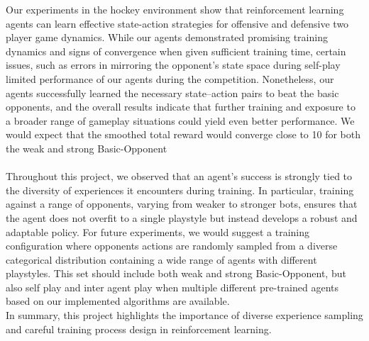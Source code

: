 Our experiments in the hockey environment show that reinforcement learning agents can learn effective state-action strategies for offensive and defensive two player game dynamics. While our agents demonstrated promising training dynamics and signs of convergence when given sufficient training time, certain issues, such as errors in mirroring the opponent’s state space during self-play limited performance of our agents during the competition. Nonetheless, our agents successfully learned the necessary state–action pairs to beat the basic opponents, and the overall results indicate that further training and exposure to a broader range of gameplay situations could yield even better performance. We would expect that the smoothed total reward would converge close to 10 for both the weak and strong Basic-Opponent\\\\
Throughout this project, we observed that an agent's success is strongly tied to the diversity of experiences it encounters during training. In particular, training against a range of opponents, varying from weaker to stronger bots, ensures that the agent does not overfit to a single playstyle but instead develops a robust and adaptable policy. For future experiments, we would suggest a training configuration where opponents actions are randomly sampled from a diverse categorical distribution containing a wide range of agents with different playstyles. This set should include both weak and strong Basic-Opponent, but also self play and inter agent play when multiple different pre-trained agents based on our implemented algorithms are available.\\
In summary, this project highlights the importance of diverse experience sampling and careful training process design in reinforcement learning.
